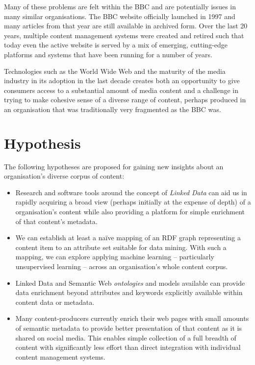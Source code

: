 Many of these problems are felt within the BBC and are potentially
issues in many similar organisations. The BBC website officially
launched in 1997 and many articles from that year are still available
in archived form. Over the last 20 years, multiple content management
systems were created and retired such that today even the active
website is served by a mix of emerging, cutting-edge platforms and
systems that have been running for a number of years.

Technologies such as the World Wide Web and the maturity of the
media industry in its adoption in the last decade creates both an
opportunity to give consumers access to a substantial amount of
media content and a challenge in trying to make cohesive sense of
a diverse range of content, perhaps produced in an organisation that
was traditionally very fragmented as the BBC was.

\section{Hypothesis}

The following hypotheses are proposed for gaining new insights about
an organisation's diverse corpus of content:

\begin{itemize}

\item Research and software tools around the concept of
  \emph{Linked Data} can aid us in rapidly acquiring a broad view
  (perhaps initially at the expense of depth) of a organisation's
  content while also providing a platform for simple enrichment of
  that content's metadata.

\item We can establish at least a na\"ive mapping of an RDF graph
  representing a content item to an attribute set suitable for data
  mining. With such a mapping, we can explore applying machine
  learning -- particularly unsupervised learning -- across an
  organisation's whole content corpus.

\item Linked Data and Semantic Web \emph{ontologies} and models
  available can provide data enrichment beyond attributes and keywords
  explicitly available within content data or metadata.

\item Many content-producers currently enrich their web pages with
  small amounts of semantic metadata to provide better presentation of
  that content as it is shared on social media. This enables simple
  collection of a full breadth of content with significantly less
  effort than direct integration with individual content management
  systems.

\end{itemize}

